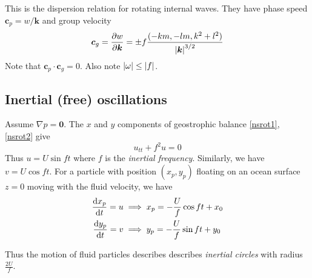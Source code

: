 \documentclass{jknotes}
\begin{document}
\begin{center}
\end{center}

This is the dispersion relation for rotating internal waves. They have phase
speed $\bm{c}_p = w/\bm{k}$ and group velocity 
\begin{equation}
	\bm{c}_g = \frac{\partial w}{\partial \bm{k}} = \pm f \frac{(-km, -lm, k^2
		+ l^2)}{\abs{\bm{k}}^{3/2}}
\end{equation}
Note that $\bm{c}_p\cdot\bm{c}_g = 0$. Also note $\abs{\omega} \le \abs{f}$.

\subsection{Inertial (free) oscillations}
Assume $\nabla p = \bm{0}$.  The $x$ and $y$ components of geostrophic balance
\eqref{nsrot1}, \eqref{nsrot2} give
\begin{equation}
	u_{tt} + f^2 u = 0
\end{equation}
Thus $u = U \sin ft$ where $f$ is the \emph{inertial frequency}. Similarly, we
have $v = U \cos ft$. For a particle with position $(x_p, y_p)$ floating on an
ocean surface $z=0$ moving with the fluid velocity, we have
\begin{equation}
	\begin{aligned}
		\frac{\diffd x_p}{\diffd t} = u &\implies x_p = -\frac{U}{f} \cos ft +
		x_0 \\
		\frac{\diffd y_p}{\diffd t} = v &\implies y_p = -\frac{U}{f} \sin ft +
		y_0
	\end{aligned}
\end{equation}

Thus the motion of fluid particles describes describes \emph{inertial circles}
with radius $\frac{2U}{f}$.
\end{document}
